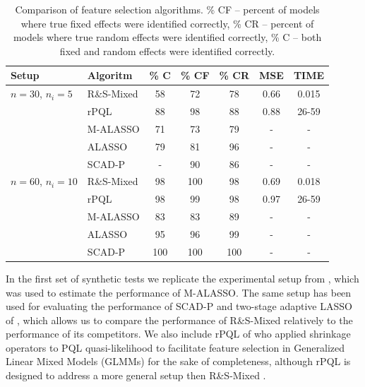 \documentclass[11pt,letterpaper]{article}
\newcommand{\ouralgo}{R\&S-Mixed }
\numberwithin{equation}{section} %
\numberwithin{figure}{section} %
\numberwithin{table}{section} %
\begin{document}
\begin{table}[h!]
\begin{center}
\begin{tabular}{|l|l|c|c|c|c|c|}
\hline
Setup & Algoritm & \% C & \% CF & \% CR & MSE & TIME \\
\hline 
\hline
$n = 30$, $n_i = 5$ & \ouralgo & 58 & 72 & 78 & 0.66 & 0.015 \\
& rPQL & 88 & 98 & 88 & 0.88 & 26-59 \\ 
& M-ALASSO & 71 & 73 & 79 & - & -\\
& ALASSO & 79 & 81 & 96 & - & - \\
& SCAD-P & - & 90 & 86 & - & - \\
\hline 
$n = 60$, $n_i = 10$ & \ouralgo & 98 & 100  & 98 & 0.69& 0.018 \\
& rPQL & 98 & 99 & 98 & 0.97 &  26-59 \\ 
& M-ALASSO & 83 & 83 & 89 & - & - \\
& ALASSO & 95 & 96 & 99 & - & -\\
& SCAD-P & 100 & 100 & 100 & - & - \\
\hline
	
\end{tabular}
\end{center}
\caption{\label{table:krishna_setup_results} Comparison of feature selection algorithms. \% CF -- percent of models where true fixed effects were identified correctly, \% CR -- percent of models where true random effects were identified correctly, \% C -- both fixed and random effects were identified correctly.}	
\end{table}

In the first set of synthetic tests we replicate the experimental setup from \cite{Krishna2008}, which was used to estimate the performance of M-ALASSO. The same setup has been used for evaluating the performance of SCAD-P \cite{Fan2012} and two-stage adaptive LASSO of \cite{Lin2013}, which allows us to compare the performance of \ouralgo relatively to the performance of its competitors. We also include rPQL of \cite{Hui2017} who applied shrinkage operators to PQL quasi-likelihood to facilitate feature selection in Generalized Linear Mixed Models (GLMMs) for the sake of completeness, although rPQL is designed to address a more general setup then \ouralgo.
\end{document}
